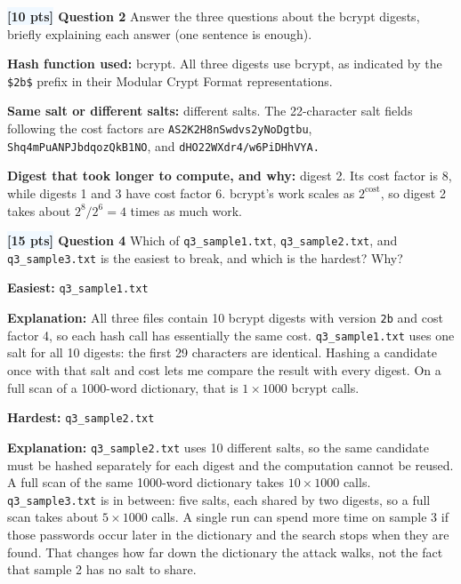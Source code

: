 \documentclass[12pt]{article}
\newcommand{\question}[2]{\textbf{\colorbox{aliceblue}{[#2 pts]} Question #1}}
\begin{document}
\question{2}{10} Answer the three questions about the bcrypt digests, briefly explaining each answer (one sentence is enough).

\begin{answer}
    \textbf{Hash function used:} bcrypt.
    All three digests use bcrypt, as indicated by the \texttt{\$2b\$} prefix in their Modular Crypt Format representations.

    \textbf{Same salt or different salts:} different salts.
    The 22-character salt fields following the cost factors are \texttt{AS2K2H8nSwdvs2yNoDgtbu}, \texttt{Shq4mPuANPJbdqozQkB1NO}, and \texttt{dHO22WXdr4/w6PiDHhVYA.}

    \textbf{Digest that took longer to compute, and why:} digest 2.
    Its cost factor is 8, while digests 1 and 3 have cost factor 6.
    bcrypt's work scales as \(2^{\text{cost}}\), so digest 2 takes about \(2^{8}/2^{6} = 4\) times as much work.
\end{answer}

\question{4}{15} Which of \texttt{q3\_sample1.txt}, \texttt{q3\_sample2.txt}, and \texttt{q3\_sample3.txt} is the easiest to break, and which is the hardest? Why?

\begin{answer}
    \textbf{Easiest:} \texttt{q3\_sample1.txt}

    \textbf{Explanation:}
    All three files contain 10 bcrypt digests with version \texttt{2b} and cost factor 4, so each hash call has essentially the same cost.
    \texttt{q3\_sample1.txt} uses one salt for all 10 digests: the first 29 characters are identical.
    Hashing a candidate once with that salt and cost lets me compare the result with every digest.
    On a full scan of a 1000-word dictionary, that is \(1 \times 1000\) bcrypt calls.

    \bigskip
    \textbf{Hardest:} \texttt{q3\_sample2.txt}

    \textbf{Explanation:}
    \texttt{q3\_sample2.txt} uses 10 different salts, so the same candidate must be hashed separately for each digest and the computation cannot be reused.
    A full scan of the same 1000-word dictionary takes \(10 \times 1000\) calls.
    \texttt{q3\_sample3.txt} is in between: five salts, each shared by two digests, so a full scan takes about \(5 \times 1000\) calls.
    A single run can spend more time on sample 3 if those passwords occur later in the dictionary and the search stops when they are found.
    That changes how far down the dictionary the attack walks, not the fact that sample 2 has no salt to share.
\end{answer}
\end{document}
